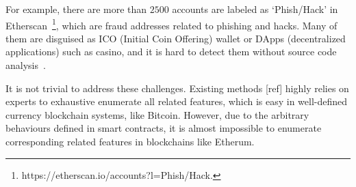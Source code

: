 For example, there are more than $2500$ accounts are labeled as `Phish/Hack' in Etherscan~\footnote{https://etherscan.io/accounts?l=Phish/Hack.}, which are fraud addresses related to phishing and hacks. Many of them are disguised as ICO (Initial Coin Offering) wallet or DApps (decentralized applications) such as casino, and it is hard to detect them without source code analysis~\cite{cerchiello2018icos}. 

It is not trivial to address these challenges. Existing methods [ref] highly
relies on experts to exhaustive enumerate all related features, which is easy
in well-defined currency blockchain systems, like Bitcoin. However, due to the arbitrary behaviours
defined in smart contracts, it is
almost impossible to enumerate corresponding related features in blockchains
like Etherum. %




